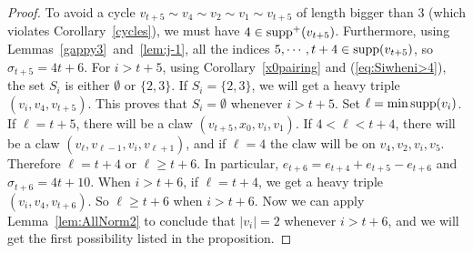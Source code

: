 \begin{proof}
To avoid a cycle $v_{t+5}\sim v_4\sim v_2\sim v_1\sim v_{t+5}$ of length bigger than $3$ (which violates Corollary~\ref{cycles}), we must have $4\in \operatorname{supp}^+(v_{t+5})$. Furthermore, using Lemmas~\ref{gappy3}~and~\ref{lem:j-1}, all the indices $5, \cdots, t+4 \in \operatorname{supp}(v_{t+5})$, so $\sigma_{t+5}=4t+6$. For $i>t+5$, using Corollary~\ref{x0pairing} and (\ref{eq:Siwheni>4}), the set $S_i$ is either $\emptyset$ or $\{2, 3\}$. If $S_i=\{2,3\}$, we will get a heavy triple $(v_i, v_4, v_{t+5})$. This proves that $S_i=\emptyset$ whenever $i>t+5$. 
Set $\ell=\min \operatorname{supp}(v_{i})$. If $\ell=t+5$, there will be a claw $(v_{t+5}, x_0, v_{i}, v_1)$. If $4<\ell<t+4$, there will be a claw $(v_{\ell}, v_{\ell-1}, v_{i}, v_{\ell+1})$, and if $\ell=4$ the claw will be on $v_4, v_2, v_{i}, v_5$. Therefore $\ell=t+4$ or $\ell\ge t+6$. In particular, $e_{t+6}=e_{t+4}+e_{t+5}-e_{t+6}$ and $\sigma_{t+6}= 4t+10$. 
When $i>t+6$, if $\ell=t+4$, we get a heavy triple $(v_i,v_4,v_{t+6})$. So $\ell\ge t+6$ when $i>t+6$. Now we can apply Lemma~\ref{lem:AllNorm2} to conclude that $|v_i|=2$ whenever $i>t+6$, and we will get the first possibility listed in the proposition.  
\end{proof}




